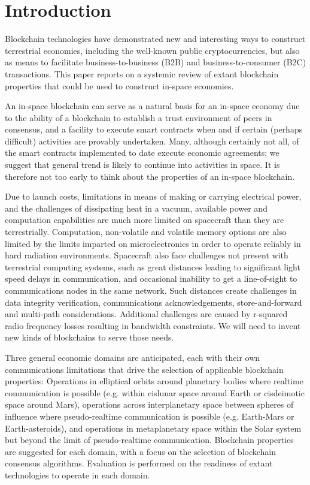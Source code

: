 \documentclass[]{aiaa-tc}%
\begin{document}
\section{Introduction}

Blockchain technologies have demonstrated new and interesting ways to construct terrestrial economies, including the well-known public cryptocurrencies, but also as means to facilitate business-to-business (B2B) and business-to-consumer (B2C) transactions. This paper reports on a systemic review of extant blockchain properties that could be used to construct in-space economies.

An in-space blockchain can serve as a natural basis for an in-space economy due to the ability of a blockchain to establish a trust environment of peers in consensus, and a facility to execute smart contracts when and if certain (perhaps difficult) activities are provably undertaken. Many, although certainly not all, of the smart contracts implemented to date execute economic agreements; we suggest that general trend is likely to continue into activities in space. It is therefore not too early to think about the properties of an in-space blockchain.

Due to launch costs, limitations in means of making or carrying electrical power, and the challenges of dissipating heat in a vacuum, available power and computation capabilities are much more limited on spacecraft than they are terrestrially. Computation, non-volatile and volatile memory options are also limited by the limits imparted on microelectronics in order to operate reliably in hard radiation environments. Spacecraft also face challenges not present with terrestrial computing systems, such as great distances leading to significant light speed delays in communication, and occasional inability to get a line-of-sight to communications nodes in the same network.  Such distances create challenges in data integrity verification, communications acknowledgements, store-and-forward and multi-path considerations. Additional challenges are caused by r-squared radio frequency losses resulting in bandwidth constraints. We will need to invent new kinds of blockchains to serve those needs.

Three general economic domains are anticipated, each with their own communications limitations that drive the selection of applicable blockchain properties: Operations in elliptical orbits around planetary bodies where realtime communication is possible (e.g. within cislunar space around Earth or cisdeimotic space around Mars), operations across interplanetary space between spheres of influence where pseudo-realtime communication is possible (e.g. Earth-Mars or Earth-asteroids), and operations in metaplanetary space within the Solar system but beyond the limit of pseudo-realtime communication. Blockchain properties are suggested for each domain, with a focus on the selection of blockchain consensus algorithms. Evaluation is performed on the readiness of extant technologies to operate in each domain.
\end{document}
